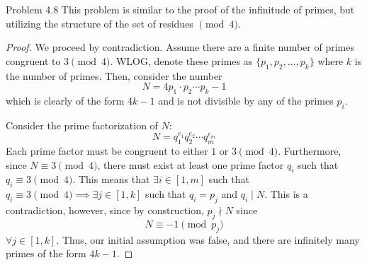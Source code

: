 \begin{sol}{Problem 4.8}
This problem is similar to the proof of the infinitude of primes, but utilizing the structure of the set of residues $\pmod{4}$.
\begin{proof}
We proceed by contradiction. Assume there are a finite number of primes congruent to $3 \pmod{4}$. WLOG, denote these primes as $\{p_1, p_2, \ldots, p_k\}$ where $k$ is the number of primes. Then, consider the number
\[
N = 4p_1\cdot p_2\cdots p_k -1
\]
which is clearly of the form $4k-1$ and is not divisible by any of the primes $p_i$. 

Consider the prime factorization of $N$:
\[
N = q_1^{e_1}q_2^{e_2}\cdots q_m^{e_m}
\]
Each prime factor must be congruent to either $1$ or $3 \pmod{4}$. Furthermore, since $N \equiv 3 \pmod{4}$, there must exist at least one prime factor $q_i$ such that $q_i \equiv 3 \pmod{4}$. This means that $\exists i \in [1, m]$ such that $q_i \equiv 3 \pmod{4} \implies \exists j \in [1, k]$ such that $q_i = p_j$ and $q_i \mid N$. This is a contradiction, however, since by construction, $p_j \nmid N$ since 
\[
N \equiv -1 \pmod{p_j}
\]
$\forall j \in [1, k]$. Thus, our initial assumption was false, and there are infinitely many primes of the form $4k-1$.
\end{proof}
\end{sol}

